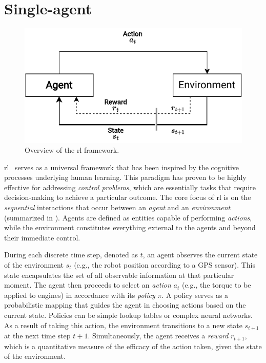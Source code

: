 \section{Single-agent}\label{chap:rl:single}
\begin{figure}
  \includegraphics[width=\textwidth]{chapters/img/single-agent-rl.drawio.pdf}
  \caption{Overview of the \ac{rl} framework.}\label{fig:rl:overview}
\end{figure}
\Acl{rl}~\cite{sutton-book} serves as a universal framework 
 that has been inspired by the cognitive processes underlying human learning. 
 This paradigm has proven to be highly effective for addressing \emph{control problems}, 
 which are essentially tasks that require decision-making to achieve a particular outcome.
%
The core focus of \ac{rl} is on the \emph{sequential} interactions that occur between an \emph{agent} 
 and an \emph{environment} (summarized in ). 
 Agents are defined as entities capable of performing \emph{actions}, 
 while the environment constitutes everything external to the agents 
 and beyond their immediate control.

During each discrete time step, denoted as $t$, 
 an agent observes the current state of the environment $s_t$ 
 (e.g., the robot position according to a GPS sensor). 
This state encapsulates the set of all observable information at that particular moment. 
The agent then proceeds to select an \emph{action} $a_t$ (e.g., the torque to be applied to engines) 
  in accordance with its \emph{policy} $\pi$. 
A policy serves as a probabilistic mapping that guides the agent in choosing actions 
 based on the current state. 
 Policies can be simple lookup tables or complex neural networks.
%
As a result of taking this action, 
 the environment transitions to a new state $s_{t+1}$ at the next time step $t+1$. 
 Simultaneously, the agent receives a \emph{reward} $r_{t+1}$, 
 which is a quantitative measure of the efficacy of the action taken, 
 given the state of the environment.

